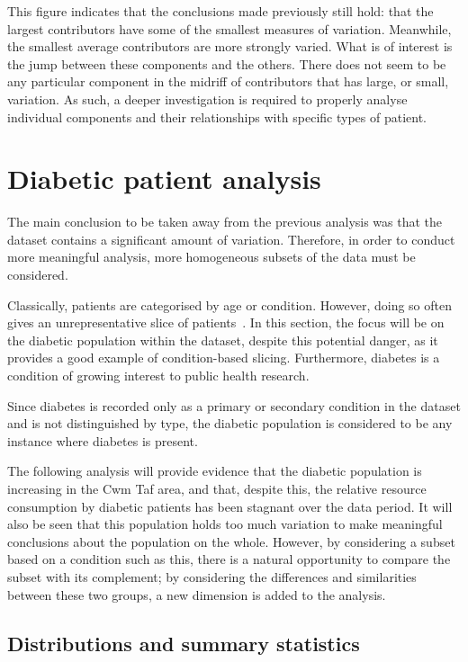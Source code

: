 This figure indicates that the conclusions made previously still hold: that the
largest contributors have some of the smallest measures of variation. Meanwhile,
the smallest average contributors are more strongly varied. What is of interest
is the jump between these components and the others. There does not seem to be
any particular component in the midriff of contributors that has large, or
small, variation. As such, a deeper investigation is required to properly
analyse individual components and their relationships with specific types of
patient.


\section{Diabetic patient analysis}\label{sec:diabetes}
\graphicspath{{chapters/data/paper/img/diabetes/}}

The main conclusion to be taken away from the previous analysis was that the
dataset contains a significant amount of variation. Therefore, in order to
conduct more meaningful analysis, more homogeneous subsets of the data must be
considered.

Classically, patients are categorised by age or condition. However, doing so
often gives an unrepresentative slice of patients~\cite{Vuik2016a}. In this
section, the focus will be on the diabetic population within the dataset,
despite this potential danger, as it provides a good example of condition-based
slicing. Furthermore, diabetes is a condition of growing interest to public
health research.

Since diabetes is recorded only as a primary or secondary condition in the
dataset and is not distinguished by type, the diabetic population is considered
to be any instance where diabetes is present.

The following analysis will provide evidence that the diabetic population is
increasing in the Cwm Taf area, and that, despite this, the relative resource
consumption by diabetic patients has been stagnant over the data period. It will
also be seen that this population holds too much variation to make meaningful
conclusions about the population on the whole. However, by considering a subset
based on a condition such as this, there is a natural opportunity to compare the
subset with its complement; by considering the differences and similarities
between these two groups, a new dimension is added to the analysis.


\subsection{Distributions and summary statistics}%
\label{subsec:diab_dists_stats}

